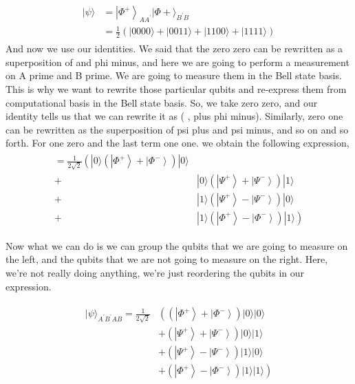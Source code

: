 \begin{align}
    \begin{aligned}
|\psi\rangle &=\left|\Phi^{+}\right\rangle_{A A^{\prime}}|\Phi+\rangle_{B^{\prime} B} \\
&=\frac{1}{2}(|0000\rangle+|0011\rangle+|1100\rangle+|1111\rangle)
\end{aligned}
\end{align}
And now we use our identities. We said that the zero zero can be rewritten as a superposition of  \ket{\Phi^+} and phi minus, and here we are going to perform a measurement on A prime and B prime. We are going to measure them in the Bell state basis. This is why we want to rewrite those particular qubits and re-express them from computational basis in the Bell state basis. So, we take zero zero, and our identity tells us that we can rewrite it as ( \ket{\Phi^+}, plus phi minus). Similarly, zero one can be rewritten as the superposition of psi plus and psi minus, and so on and so forth. For one zero and the last term one one. we obtain the following expression,
\begin{align}
    \begin{array}{ll}
=\frac{1}{2 \sqrt{2}}\left(|0\rangle\left(\left|\Phi^{+}\right\rangle+\left|\Phi^{-}\right\rangle\right)|0\rangle\right. \\
+ & |0\rangle\left(\left|\Psi^{+}\right\rangle+\left|\Psi^{-}\right\rangle\right)|1\rangle \\
+ & |1\rangle\left(\left|\Psi^{+}\right\rangle-\left|\Psi^{-}\right\rangle\right)|0\rangle \\
+ & \left.|1\rangle\left(\left|\Phi^{+}\right\rangle-\left|\Phi^{-}\right\rangle\right)|1\rangle\right)
\end{array}
\end{align}

Now what we can do is we can group the qubits that we are going to measure on the left, and the qubits that we are not going to measure on the right. Here, we're not really doing anything, we're just reordering the qubits in our expression. 

\begin{align}
        \begin{aligned}
|\psi\rangle_{A^{\prime} B^{\prime} A B}=\frac{1}{2 \sqrt{2}} &\left(\left(\left|\Phi^{+}\right\rangle+\left|\Phi^{-}\right\rangle\right)|0\rangle|0\rangle\right.\\
&+\left(\left|\Psi^{+}\right\rangle+\left|\Psi^{-}\right\rangle\right)|0\rangle|1\rangle \\
&+\left(\left|\Psi^{+}\right\rangle-\left|\Psi^{-}\right\rangle\right)|1\rangle|0\rangle \\
&\left.+\left(\left|\Phi^{+}\right\rangle-\left|\Phi^{-}\right\rangle\right)|1\rangle|1\rangle\right)
\end{aligned}
\end{align}

